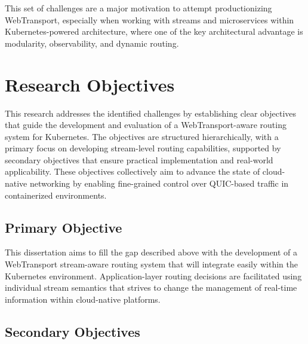 This set of challenges are a major motivation to attempt productionizing WebTransport, especially when working with streams and microservices within Kubernetes-powered architecture, where one of the key architectural advantage is modularity, observability, and dynamic routing.

\section{Research Objectives}

This research addresses the identified challenges by establishing clear objectives that guide the development and evaluation of a WebTransport-aware routing system for Kubernetes. The objectives are structured hierarchically, with a primary focus on developing stream-level routing capabilities, supported by secondary objectives that ensure practical implementation and real-world applicability. These objectives collectively aim to advance the state of cloud-native networking by enabling fine-grained control over QUIC-based traffic in containerized environments.

\subsection{Primary Objective}

This dissertation aims to fill the gap described above with the development of a WebTransport stream-aware routing system that will integrate easily within the Kubernetes environment. Application-layer routing decisions are facilitated using individual stream semantics that strives to change the management of real-time information within cloud-native platforms.

\subsection{Secondary Objectives}

